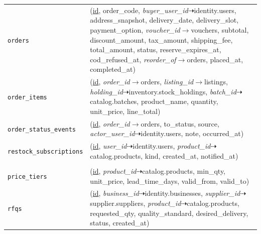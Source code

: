 \begin{longtable}{L{3.10cm} L{11.90cm}}
\texttt{orders} & (\underline{id}, order\_\allowbreak{}code, \textit{buyer\_\allowbreak{}user\_\allowbreak{}id}$\dashrightarrow$identity.users, address\_\allowbreak{}snapshot, delivery\_\allowbreak{}date, delivery\_\allowbreak{}slot, payment\_\allowbreak{}option, \textit{voucher\_\allowbreak{}id}$\rightarrow$vouchers, subtotal, discount\_\allowbreak{}amount, tax\_\allowbreak{}amount, shipping\_\allowbreak{}fee, total\_\allowbreak{}amount, status, reserve\_\allowbreak{}expires\_\allowbreak{}at, cod\_\allowbreak{}refused\_\allowbreak{}at, \textit{reorder\_\allowbreak{}of}$\rightarrow$orders, placed\_\allowbreak{}at, completed\_\allowbreak{}at) \\
\texttt{order\_\allowbreak{}items} & (\underline{id}, \textit{order\_\allowbreak{}id}$\rightarrow$orders, \textit{listing\_\allowbreak{}id}$\rightarrow$listings, \textit{holding\_\allowbreak{}id}$\dashrightarrow$inventory.stock\_\allowbreak{}holdings, \textit{batch\_\allowbreak{}id}$\dashrightarrow$catalog.batches, product\_\allowbreak{}name, quantity, unit\_\allowbreak{}price, line\_\allowbreak{}total) \\
\texttt{order\_\allowbreak{}status\_\allowbreak{}events} & (\underline{id}, \textit{order\_\allowbreak{}id}$\rightarrow$orders, to\_\allowbreak{}status, source, \textit{actor\_\allowbreak{}user\_\allowbreak{}id}$\dashrightarrow$identity.users, note, occurred\_\allowbreak{}at) \\
\texttt{restock\_\allowbreak{}subscriptions} & (\underline{id}, \textit{user\_\allowbreak{}id}$\dashrightarrow$identity.users, \textit{product\_\allowbreak{}id}$\dashrightarrow$catalog.products, kind, created\_\allowbreak{}at, notified\_\allowbreak{}at) \\
 \\
\texttt{price\_\allowbreak{}tiers} & (\underline{id}, \textit{product\_\allowbreak{}id}$\dashrightarrow$catalog.products, min\_\allowbreak{}qty, unit\_\allowbreak{}price, lead\_\allowbreak{}time\_\allowbreak{}days, valid\_\allowbreak{}from, valid\_\allowbreak{}to) \\
\texttt{rfqs} & (\underline{id}, \textit{business\_\allowbreak{}id}$\dashrightarrow$identity.businesses, \textit{supplier\_\allowbreak{}id}$\dashrightarrow$supplier.suppliers, \textit{product\_\allowbreak{}id}$\dashrightarrow$catalog.products, requested\_\allowbreak{}qty, quality\_\allowbreak{}standard, desired\_\allowbreak{}delivery, status, created\_\allowbreak{}at) \\

\end{longtable}
